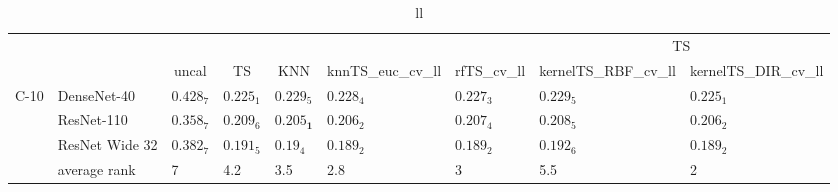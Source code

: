 \begin{table*}
\caption{ll}
\label{table:ll}
\centering
\begin{adjustbox}{width=\textwidth}

\begin{tabular}{lllllllll}
\toprule
\multicolumn{7}{c}{}&\multicolumn{2}{c}{TS}\\
\cmidrule{8-9}
\multicolumn{1}{c}{}&\multicolumn{1}{c}{}&\multicolumn{1}{c}{uncal}&\multicolumn{1}{c}{TS}&\multicolumn{1}{c}{KNN}&\multicolumn{1}{c}{knnTS_euc_cv_ll}&\multicolumn{1}{c}{rfTS_cv_ll}&\multicolumn{1}{c}{kernelTS_RBF_cv_ll}&\multicolumn{1}{c}{kernelTS_DIR_cv_ll}\\\midrule
C-10 & DenseNet-40 &  $0.428_{7}$ &  $0.225_{1}$ &           $0.229_{5}$ &     $0.228_{4}$ &  $0.227_{3}$ &        $0.229_{5}$ &        $0.225_{1}$ \\
     & ResNet-110 &  $0.358_{7}$ &  $0.209_{6}$ &  $\mathbf{0.205_{1}}$ &     $0.206_{2}$ &  $0.207_{4}$ &        $0.208_{5}$ &        $0.206_{2}$ \\
     & ResNet Wide 32 &  $0.382_{7}$ &  $0.191_{5}$ &            $0.19_{4}$ &     $0.189_{2}$ &  $0.189_{2}$ &        $0.192_{6}$ &        $0.189_{2}$ \\
\cmidrule{2-9}
     & average rank &            7 &          4.2 &                   3.5 &             2.8 &            3 &                5.5 &                  2 \\
\cmidrule{1-9}
\bottomrule
\end{tabular}


\end{adjustbox}
\end{table*}